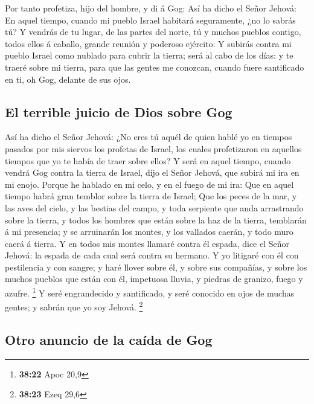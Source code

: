  Por tanto profetiza, hijo del hombre, y di á Gog: Así ha
dicho el Señor Jehová: En aquel tiempo, cuando mi pueblo Israel habitará
seguramente, ¿no lo sabrás tú?  Y vendrás de tu lugar, de
las partes del norte, tú y muchos pueblos contigo, todos ellos á
caballo, grande reunión y poderoso ejército:  Y subirás
contra mi pueblo Israel como nublado para cubrir la tierra; será al cabo
de los días: y te traeré sobre mi tierra, para que las gentes me
conozcan, cuando fuere santificado en ti, oh Gog, delante de sus ojos.

\hypertarget{el-terrible-juicio-de-dios-sobre-gog}{%
\subsection{El terrible juicio de Dios sobre
Gog}\label{el-terrible-juicio-de-dios-sobre-gog}}

 Así ha dicho el Señor Jehová: ¿No eres tú aquél de quien
hablé yo en tiempos pasados por mis siervos los profetas de Israel, los
cuales profetizaron en aquellos tiempos que yo te había de traer sobre
ellos?  Y será en aquel tiempo, cuando vendrá Gog contra
la tierra de Israel, dijo el Señor Jehová, que subirá mi ira en mi
enojo.  Porque he hablado en mi celo, y en el fuego de mi
ira: Que en aquel tiempo habrá gran temblor sobre la tierra de Israel;
 Que los peces de la mar, y las aves del cielo, y las
bestias del campo, y toda serpiente que anda arrastrando sobre la
tierra, y todos los hombres que están sobre la haz de la tierra,
temblarán á mi presencia; y se arruinarán los montes, y los vallados
caerán, y todo muro caerá á tierra.  Y en todos mis
montes llamaré contra él espada, dice el Señor Jehová: la espada de cada
cual será contra su hermano.  Y yo litigaré con él con
pestilencia y con sangre; y haré llover sobre él, y sobre sus compañías,
y sobre los muchos pueblos que están con él, impetuosa lluvia, y piedras
de granizo, fuego y azufre. \footnote{\textbf{38:22} Apoc 20,9}
 Y seré engrandecido y santificado, y seré conocido en
ojos de muchas gentes; y sabrán que yo soy Jehová. \footnote{\textbf{38:23}
  Ezeq 29,6}

\hypertarget{otro-anuncio-de-la-cauxedda-de-gog}{%
\subsection{Otro anuncio de la caída de
Gog}\label{otro-anuncio-de-la-cauxedda-de-gog}}

